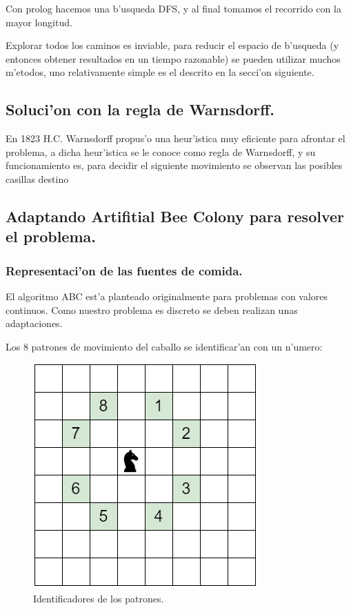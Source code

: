 \documentclass[12pt]{article}
\begin{document}
    Con prolog hacemos una b'usqueda DFS, y al final tomamos
    el recorrido con la mayor longitud.

    Explorar todos los caminos es inviable, para reducir el espacio
    de b'usqueda (y entonces obtener resultados en un tiempo razonable)
    se pueden utilizar muchos m'etodos, uno relativamente
    simple es el descrito en la secci'on siguiente.



    \subsection{Soluci'on con la regla de Warnsdorff.}
    En 1823  H.C. Warnsdorff propus'o una heur'istica muy eficiente para afrontar el problema, a dicha heur'istica se le conoce
    como regla de Warnsdorff, y su funcionamiento es, para decidir el siguiente movimiento
    se observan las posibles casillas destino


    \subsection{Adaptando Artifitial Bee Colony para resolver el problema.}

    \subsubsection{Representaci'on de las fuentes de comida.}

    El algoritmo ABC est'a planteado originalmente para problemas con valores continuos. Como nuestro problema es discreto
    se deben realizan unas adaptaciones.


    Los 8 patrones de movimiento del caballo se identificar'an con un n'umero:
    \begin{figure}[H]
        \centering
        \includegraphics[scale=0.5]{id_move.png}
        \caption{Identificadores de los patrones.}
        \label{fig:id_move}
    \end{figure}
\end{document}
